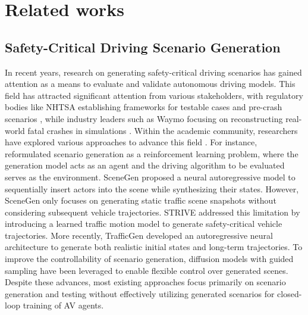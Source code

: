 \section{Related works}
\label{sec2}
\subsection{Safety-Critical Driving Scenario Generation}

In recent years, research on generating safety-critical driving scenarios has gained attention as a means to evaluate and validate autonomous driving models. This field has attracted significant attention from various stakeholders, with regulatory bodies like NHTSA establishing frameworks for testable cases and pre-crash scenarios \citep{najm2007pre,thorn2018framework}, while industry leaders such as Waymo focusing on reconstructing real-world fatal crashes in simulations \citep{scanlon2021waymo}. Within the academic community, researchers have explored various approaches to advance this field \citep{ding2023survey}. For instance, \cite{ding2020learning} reformulated scenario generation as a reinforcement learning problem, where the generation model acts as an agent and the driving algorithm to be evaluated serves as the environment. SceneGen \citep{tan2021scenegen} proposed a neural autoregressive model to sequentially insert actors into the scene while synthesizing their states. However, SceneGen only focuses on generating static traffic scene snapshots without considering subsequent vehicle trajectories. STRIVE \citep{rempe2022generating} addressed this limitation by introducing a learned traffic motion model to generate safety-critical vehicle trajectories. More recently, TrafficGen \citep{feng2023trafficgen} developed an autoregressive neural architecture to generate both realistic initial states and long-term trajectories. To improve the controllability of scenario generation, diffusion models with guided sampling \citep{zhong2023guided,lu2024scenecontrol} have been leveraged to enable flexible control over generated scenes. Despite these advances, most existing approaches focus primarily on scenario generation and testing without effectively utilizing generated scenarios for closed-loop training of AV agents.


